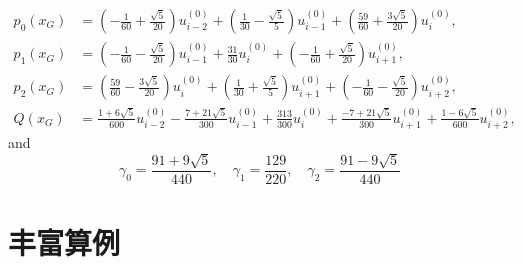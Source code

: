 \documentclass{book}
\begin{document}
\begin{equation}
    \begin{aligned}
        p_{0}\left(x_{G}\right) & =\left(-\frac{1}{60}+\frac{\sqrt{5}}{20}\right) u_{i-2}^{(0)}+\left(\frac{1}{30}-\frac{\sqrt{5}}{5}\right) u_{i-1}^{(0)}+\left(\frac{59}{60}+\frac{3 \sqrt{5}}{20}\right) u_{i}^{(0)},       \\
        p_{1}\left(x_{G}\right) & =\left(-\frac{1}{60}-\frac{\sqrt{5}}{20}\right) u_{i-1}^{(0)}+\frac{31}{30} u_{i}^{(0)}+\left(-\frac{1}{60}+\frac{\sqrt{5}}{20}\right) u_{i+1}^{(0)},                                        \\
        p_{2}\left(x_{G}\right) & =\left(\frac{59}{60}-\frac{3 \sqrt{5}}{20}\right) u_{i}^{(0)}+\left(\frac{1}{30}+\frac{\sqrt{5}}{5}\right) u_{i+1}^{(0)}+\left(-\frac{1}{60}-\frac{\sqrt{5}}{20}\right) u_{i+2}^{(0)},       \\
        Q\left(x_{G}\right)     & =\frac{1+6 \sqrt{5}}{600} u_{i-2}^{(0)}-\frac{7+21 \sqrt{5}}{300} u_{i-1}^{(0)}+\frac{313}{300} u_{i}^{(0)}+\frac{-7+21 \sqrt{5}}{300} u_{i+1}^{(0)}+\frac{1-6 \sqrt{5}}{600} u_{i+2}^{(0)},
    \end{aligned}
\end{equation}
and
\begin{equation}
    \gamma_{0}=\frac{91+9 \sqrt{5}}{440}, \quad \gamma_{1}=\frac{129}{220}, \quad \gamma_{2}=\frac{91-9 \sqrt{5}}{440}
\end{equation}


\chapter{丰富算例}
\end{document}
